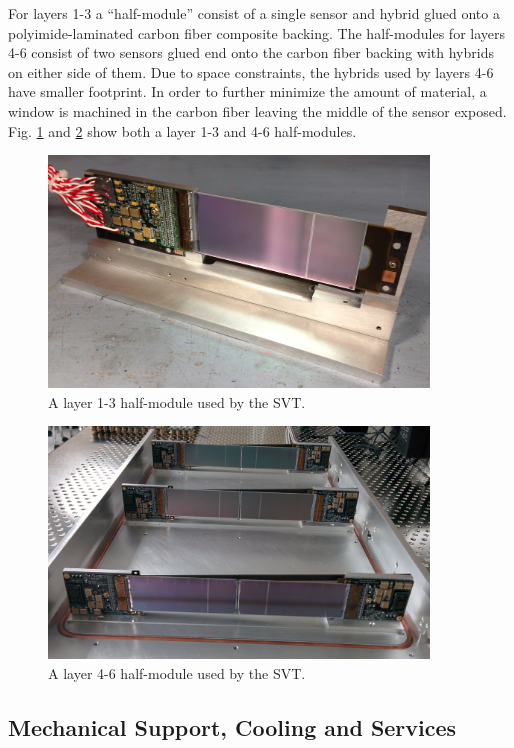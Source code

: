 For layers 1-3 a ``half-module'' consist of a single sensor and hybrid glued 
onto a polyimide-laminated carbon fiber composite backing.  The half-modules 
for layers 4-6 consist of two sensors glued end onto the carbon fiber backing 
with hybrids on either side of them.  Due to space constraints, the hybrids used
by layers 4-6 have smaller footprint.  In order to further minimize the 
amount of material, a window is machined in the carbon fiber leaving the middle
of the sensor exposed. Fig. \ref{fig:l13_hm} and \ref{fig:l46_hm} show both a layer 1-3 and 4-6 
half-modules.
\begin{figure}
    \centering
    \includegraphics[width=0.9\textwidth]{images/l13_half_module.jpg}
    \caption{A layer 1-3 half-module used by the SVT. }
    \label{fig:l13_hm}
\end{figure}
\begin{figure}
    \centering
    \includegraphics[width=0.9\textwidth]{images/l46_half_module.jpg}
    \caption{A layer 4-6 half-module used by the SVT. }
    \label{fig:l46_hm}
\end{figure}


\subsection{Mechanical Support, Cooling and Services}


